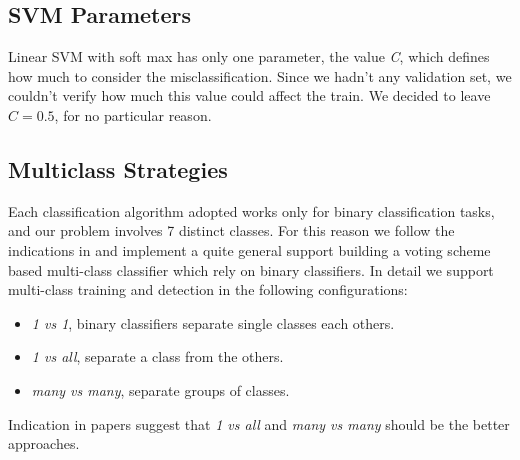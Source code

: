 \subsection{SVM Parameters}

Linear SVM with soft max has only one parameter, the value \emph{C}, which
defines how much to consider the misclassification. Since we hadn't any
validation set, we couldn't verify how much this value could affect the train.
We decided to leave $C=0.5$, for no particular reason.

\subsection{Multiclass Strategies}

Each classification algorithm adopted works only for binary classification tasks, and our problem involves 7 distinct classes. For this reason we follow the indications in \cite{Littlewort04dynamicsof, Bartlett06fullyautomatic} and implement a quite general support building a voting scheme based multi-class classifier which rely on binary classifiers. 
In detail we support multi-class training and detection in the following configurations:

\begin{itemize}
\item \emph{1 vs 1}, binary classifiers separate single classes each others.
\item \emph{1 vs all}, separate a class from the others.
\item \emph{many vs many}, separate groups of classes.
\end{itemize}

Indication in papers suggest that \emph{1 vs all} and \emph{many vs many} should be the better approaches.
